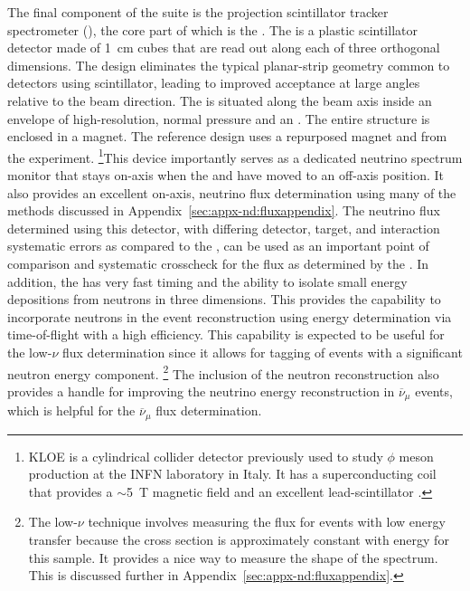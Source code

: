 The final component of the   suite is the \threed projection scintillator tracker spectrometer (),  the core part of which is the .  The  is a plastic scintillator detector made of \SI{1}{cm} cubes that are read out along each of three orthogonal dimensions.  The design eliminates the typical planar-strip geometry common to detectors using scintillator, leading to improved acceptance at large angles relative to the beam direction.  The  is situated along the beam axis inside an envelope of high-resolution, normal pressure  and an .   The entire structure is enclosed in a magnet. The reference design uses a repurposed magnet and  from the  experiment. \footnote{KLOE is a cylindrical collider detector previously used to study $\phi$ meson production at the INFN laboratory in Italy.  It has a superconducting coil that provides a $\sim$5~T magnetic field and an excellent lead-scintillator  \cite{Franzini:2006aa}.}This device importantly serves as a dedicated  neutrino spectrum monitor that stays on-axis when the    and  have moved to an off-axis position. 
It also provides an excellent on-axis, neutrino flux determination using many of the methods discussed in Appendix~\ref{sec:appx-nd:fluxappendix}.  The neutrino flux determined using this detector, with  differing detector, target, and interaction systematic errors as compared to the , can be used as an important point of comparison and systematic crosscheck for the flux as determined by the .
In addition, the  has very fast timing and the ability to isolate small energy depositions from neutrons in three dimensions.  This provides the capability to  incorporate neutrons in the event reconstruction using energy determination via time-of-flight with a high efficiency. This capability is expected to be useful for the low-$\nu$ flux determination since it allows for tagging of events with a significant neutron energy component. \footnote{The low-$\nu$ technique involves measuring the flux for events with low energy transfer because the cross section is approximately constant with energy for this sample.  It provides a nice way to measure the shape of the spectrum.  This is discussed further in Appendix~\ref{sec:appx-nd:fluxappendix}.}  The inclusion of the neutron reconstruction also provides a handle for improving the neutrino energy reconstruction in $\overline{\nu}_\mu$  events, which is helpful for the $\overline{\nu}_\mu$ flux determination.
